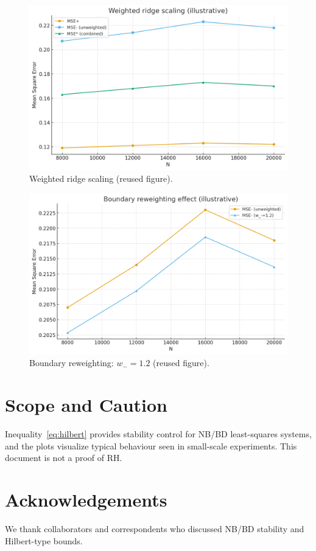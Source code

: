 \documentclass[12pt]{article}
\theoremstyle{remark}
\begin{document}
\begin{figure}[h]
\centering
\includegraphics[width=0.8\linewidth]{weighted_scaling.png}
\caption{Weighted ridge scaling (reused figure).}
\end{figure}

\begin{figure}[h]
\centering
\includegraphics[width=0.8\linewidth]{boundary_reweighting.png}
\caption{Boundary reweighting: $w_- = 1.2$ (reused figure).}
\end{figure}

\section{Scope and Caution}
Inequality~\eqref{eq:hilbert} provides stability control for NB/BD least-squares systems, and the plots
visualize typical behaviour seen in small-scale experiments. This document is not a proof of RH.

\section*{Acknowledgements}
We thank collaborators and correspondents who discussed NB/BD stability and Hilbert-type bounds.
\end{document}
